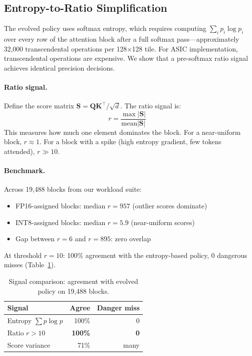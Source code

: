 \documentclass[10pt,twocolumn]{article}
\begin{document}
\subsection{Entropy-to-Ratio Simplification}
\label{sec:ratio}

The evolved policy uses softmax entropy, which requires computing
$\sum_i p_i \log p_i$ over every row of the attention block after a
full softmax pass---approximately 32{,}000 transcendental operations
per 128$\times$128 tile. For ASIC implementation, transcendental
operations are expensive. We show that a pre-softmax ratio signal
achieves identical precision decisions.

\paragraph{Ratio signal.}
Define the score matrix $\mathbf{S} = \mathbf{Q}\mathbf{K}^\top/\sqrt{d}$.
The ratio signal is:
\[
r = \frac{\max|\mathbf{S}|}{\mathrm{mean}|\mathbf{S}|}
\]
This measures how much one element dominates the block. For a
near-uniform block, $r \approx 1$. For a block with a spike (high
entropy gradient, few tokens attended), $r \gg 10$.

\paragraph{Benchmark.}
Across 19{,}488 blocks from our workload suite:
\begin{itemize}
  \item FP16-assigned blocks: median $r = 957$ (outlier scores dominate)
  \item INT8-assigned blocks: median $r = 5.9$ (near-uniform scores)
  \item Gap between $r = 6$ and $r = 895$: zero overlap
\end{itemize}

At threshold $r = 10$: 100\% agreement with the entropy-based policy,
0 dangerous misses (Table~\ref{tab:signal_comparison}).

\begin{table}[tbp]
\centering
\caption{Signal comparison: agreement with evolved policy on 19{,}488 blocks.}
\label{tab:signal_comparison}
\small
\begin{tabular}{lrr}
\toprule
Signal & Agree & Danger miss \\
\midrule
Entropy $\sum p\log p$ & 100\% & 0 \\
Ratio $r > 10$         & \textbf{100\%} & \textbf{0} \\
Score variance         &  71\% & many \\
\bottomrule
\end{tabular}
\end{table}
\end{document}
